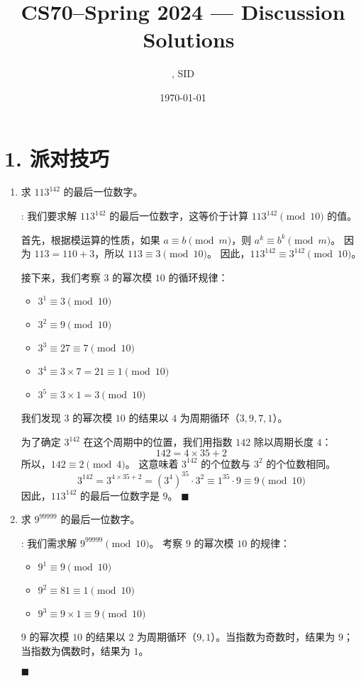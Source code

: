 \documentclass[11pt]{article}
\title{CS70--Spring 2024 --- Discussion \Homework \ Solutions}
\author{\Name, SID \SID}
\date{\today}
\newenvironment{qparts}{\begin{enumerate}[{(}a{)}]}{\end{enumerate}}
\def\endproofmark{$\blacksquare$}
\newenvironment{proof}{\par\noindent{\bf 证明}:}{\endproofmark\smallskip}
\begin{document}
\maketitle

\section*{1. 派对技巧}
\begin{qparts}
\item 求 $113^{142}$ 的最后一位数字。

\begin{proof}
我们要求解 $113^{142}$ 的最后一位数字，这等价于计算 $113^{142} \pmod{10}$ 的值。

首先，根据模运算的性质，如果 $a \equiv b \pmod{m}$，则 $a^k \equiv b^k \pmod{m}$。
因为 $113 = 110 + 3$，所以 $113 \equiv 3 \pmod{10}$。
因此，$113^{142} \equiv 3^{142} \pmod{10}$。

接下来，我们考察 $3$ 的幂次模 $10$ 的循环规律：
\begin{itemize}
    \item $3^1 \equiv 3 \pmod{10}$
    \item $3^2 \equiv 9 \pmod{10}$
    \item $3^3 \equiv 27 \equiv 7 \pmod{10}$
    \item $3^4 \equiv 3 \times 7 = 21 \equiv 1 \pmod{10}$
    \item $3^5 \equiv 3 \times 1 = 3 \pmod{10}$
\end{itemize}
我们发现 $3$ 的幂次模 $10$ 的结果以 $4$ 为周期循环（$3, 9, 7, 1$）。

为了确定 $3^{142}$ 在这个周期中的位置，我们用指数 $142$ 除以周期长度 $4$：
\[ 142 = 4 \times 35 + 2 \]
所以，$142 \equiv 2 \pmod{4}$。
这意味着 $3^{142}$ 的个位数与 $3^2$ 的个位数相同。
\[ 3^{142} = 3^{4 \times 35 + 2} = (3^4)^{35} \cdot 3^2 \equiv 1^{35} \cdot 9 \equiv 9 \pmod{10} \]
因此，$113^{142}$ 的最后一位数字是 $9$。
\end{proof}

\item 求 $9^{99999}$ 的最后一位数字。

\begin{proof}
我们需求解 $9^{99999} \pmod{10}$。
考察 $9$ 的幂次模 $10$ 的规律：
\begin{itemize}
    \item $9^1 \equiv 9 \pmod{10}$
    \item $9^2 \equiv 81 \equiv 1 \pmod{10}$
    \item $9^3 \equiv 9 \times 1 \equiv 9 \pmod{10}$
\end{itemize}
$9$ 的幂次模 $10$ 的结果以 $2$ 为周期循环（$9, 1$）。当指数为奇数时，结果为 $9$；当指数为偶数时，结果为 $1$。


\end{proof}
\end{qparts}
\end{document}
